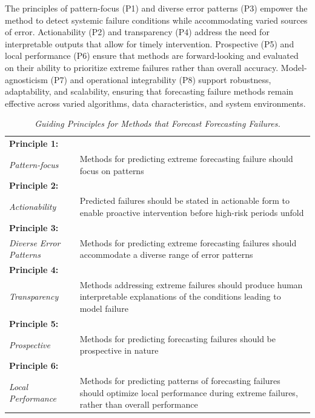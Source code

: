 \documentclass[]{interact}
\theoremstyle{definition}
\begin{document}
The principles of pattern-focus (P1) and diverse error patterns (P3) empower the method to detect systemic failure conditions while accommodating varied sources of error. Actionability (P2) and transparency (P4) address the need for interpretable outputs that allow for timely intervention. Prospective (P5) and local performance (P6) ensure that methods are forward-looking and evaluated on their ability to prioritize extreme failures rather than overall accuracy. Model-agnosticism (P7) and operational integrability (P8) support robustness, adaptability, and scalability, ensuring that forecasting failure methods remain effective across varied algorithms, data characteristics, and system environments. 

\begin{table}
\centering
\caption{\textit{Guiding Principles for Methods that Forecast Forecasting Failures.}}
\small
\renewcommand{\arraystretch}{1.3}
\begin{tabular}{|m{2.7cm}|m{12.5cm}|}
\hline
\centering\textbf{Principle 1:} \\ \centering\textit{Pattern-focus} & Methods for predicting extreme forecasting failure should focus on patterns \\
\hline
\centering\textbf{Principle 2:} \\ \centering\textit{Actionability} & Predicted failures should be stated in actionable form to enable proactive intervention before high-risk periods unfold \\
\hline
\centering\textbf{Principle 3:} \\ \centering\textit{Diverse Error Patterns} & Methods for predicting extreme forecasting failures should accommodate a diverse range of error patterns \\
\hline
\centering\textbf{Principle 4:} \\ \centering\textit{Transparency} & Methods addressing extreme failures should produce human interpretable explanations of the conditions leading to model failure \\
\hline
\centering\textbf{Principle 5:} \\ \centering\textit{Prospective} & Methods for predicting forecasting failures should be prospective in nature \\
\hline
\centering\textbf{Principle 6:} \\ \centering\textit{Local Performance} & Methods for predicting patterns of forecasting failures should optimize local performance during extreme failures, rather than overall performance \\

\end{tabular}
\end{table}
\end{document}
